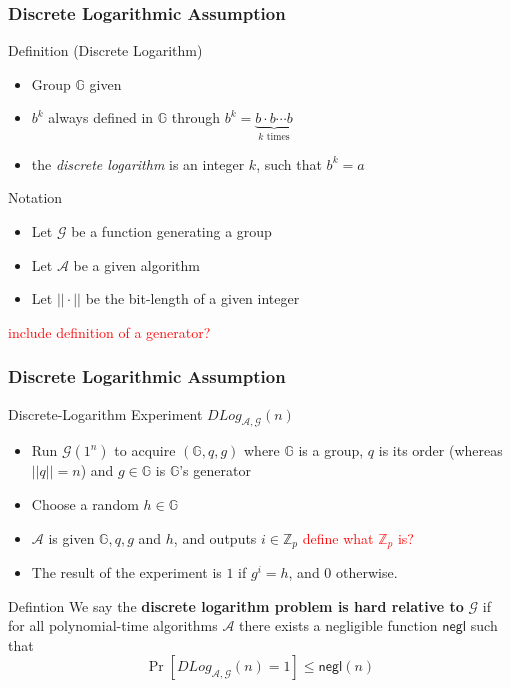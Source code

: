 \begin{frame}
	\frametitle{Discrete Logarithmic Assumption}

	\begin{block}{Definition (Discrete Logarithm)}
		\begin{itemize}
			\item Group $\mathbb{G}$ given
			\item $b^k$ always defined in $\mathbb{G}$ through $b^k = \underbrace{b\cdot b \cdots b}_{k\text{ times}}$
			\item the \textit{discrete logarithm} is an integer $k$, such that $b^k = a$
		\end{itemize}
	\end{block}
	\begin{block}{Notation}
		\begin{itemize}
			\item Let $\mathcal{G}$ be a function generating a group
			\item Let $\mathcal{A}$ be a given algorithm
			\item Let $||\cdot||$ be the bit-length of a given integer
		\end{itemize}
	\end{block}
	\textcolor{red}{include definition of a generator?}
\end{frame}

\begin{frame}
	\frametitle{Discrete Logarithmic Assumption}
	\begin{block}{Discrete-Logarithm Experiment $DLog_{\mathcal{A}, \mathcal{G}}(n)$} %
		\begin{itemize}
			\item Run $\mathcal{G}(1^n)$ to acquire $(\mathbb{G}, q, g)$ where $\mathbb{G}$ is a group, $q$ is its order (whereas $||q|| = n$) and $g\in \mathbb{G}$ is $\mathbb{G}$'s generator
			\item Choose a random $h\in\mathbb{G}$
			\item $\mathcal{A}$ is given $\mathbb{G}, q, g$ and $h$, and outputs $i\in \mathbb{Z}_p$ \textcolor{red}{define what $\mathbb{Z}_p$ is?}
			\item The result of the experiment is $1$ if $g^i = h$, and $0$ otherwise.
		\end{itemize}
	\end{block}
	\begin{block}{Defintion}
		We say the \textbf{discrete logarithm problem is hard relative to} $\mathcal{G}$ if for all polynomial-time algorithms $\mathcal{A}$ there exists a negligible function $\textsf{negl}$ such that 
			$$\Pr[DLog_{\mathcal{A}, \mathcal{G}}(n) = 1] \leq \textsf{negl}(n)$$
	\end{block}
\end{frame}